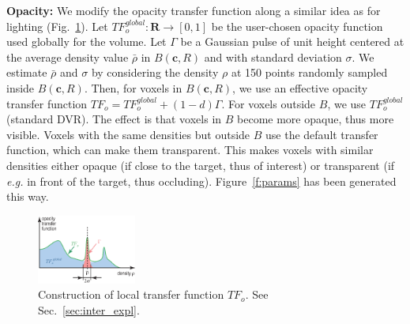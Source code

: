 \vspace{0.2cm}
\noindent\textbf{Opacity:} We modify the opacity transfer function along a similar idea as for lighting (Fig.~\ref{fig:tf}). Let $TF_{o}^{global} : \mathbf{R} \rightarrow [0,1]$ be the user-chosen opacity function used globally for the volume. Let $\Gamma$ be a Gaussian pulse of unit height centered at the average density value $\bar{\rho}$ in $B(\mathbf{c},R)$ and with standard deviation $\sigma$. We estimate $\bar{\rho}$ and $\sigma$ by considering the density $\rho$ at 150 points randomly sampled inside $B(\mathbf{c},R)$. Then, for voxels in $B(\mathbf{c},R)$, we use an effective opacity transfer function $TF_o = TF_{o}^{global} + (1-d) \Gamma$. For voxels outside $B$, we use $TF_{o}^{global}$ (standard DVR). The effect is that voxels in $B$ become more opaque, thus more visible. Voxels with the same densities but outside $B$ use the default transfer function, which can make them transparent. This makes voxels with similar densities either opaque (if close to the target, thus of interest) or transparent (if \emph{e.g.} in front of the target, thus occluding). Figure~\ref{f:params} has been generated this way. 



\begin{figure}[htbp!]
\centering
\includegraphics[width=0.29\textwidth]{images/tf.eps}
\vspace{-0.15cm}
\caption{Construction of local transfer function $TF_{o}$. See Sec.~\ref{sec:inter_expl}.}
\vspace{-0.15cm}
\label{fig:tf}
\end{figure}


